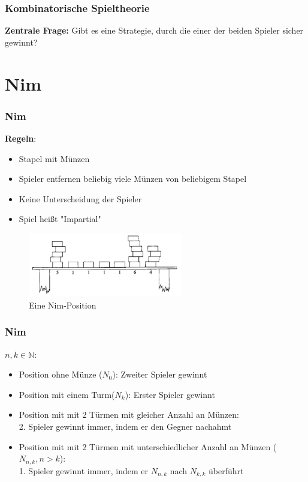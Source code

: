 \documentclass[12pt, aspectratio=169]{beamer}
\begin{document}
\begin{frame}
    \frametitle{Kombinatorische Spieltheorie}
    \centering
    \huge{\textbf{Zentrale Frage:} Gibt es eine Strategie, durch die einer der beiden Spieler sicher gewinnt?}
\end{frame}

\section{Nim}

\begin{frame}
    \frametitle{Nim}
    \textbf{Regeln}:
    \begin{itemize}
        \item<1-> Stapel mit Münzen
        \item<1-> Spieler entfernen beliebig viele Münzen von beliebigem Stapel
        \item<1-> Keine Unterscheidung der Spieler
        \item<2-> Spiel heißt "Impartial" 
    \end{itemize}
    \begin{figure}
        \centering
        \includegraphics[width=0.6\textwidth]{pic/nim-pos.png}
        \caption{Eine Nim-Position \tiny{\cite{ww}}}
    \end{figure}
\end{frame}

\begin{frame}
    \frametitle{Nim}
    $n,k \in \mathbb{N}$:
    \begin{itemize}
        \item<1-> Position ohne Münze ($N_{0}$): Zweiter Spieler gewinnt
        \item<2-> Position mit einem Turm($N_{k}$): Erster Spieler gewinnt
        \item<3-> Position mit mit 2 Türmen mit gleicher Anzahl an Münzen: \\ 2. Spieler gewinnt immer, indem er den Gegner nachahmt
        \item<4-> Position mit mit 2 Türmen mit unterschiedlicher Anzahl an Münzen ($N_{n,k}, n > k$): \\ 1. Spieler gewinnt immer, indem er $N_{n,k}$ nach $N_{k,k}$ überführt
    \end{itemize}
\end{frame}
\end{document}
